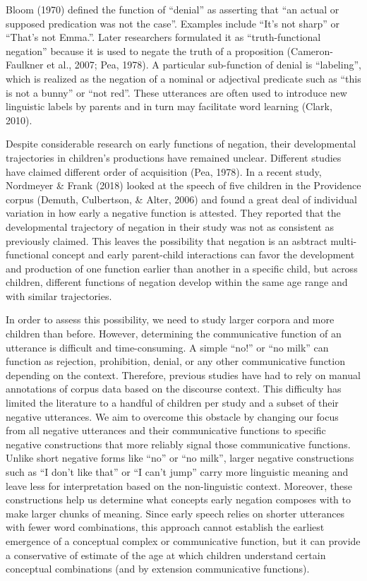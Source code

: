 \documentclass[10pt, letterpaper]{article}
\begin{document}
Bloom (1970) defined the function of ``denial'' as asserting that ``an
actual or supposed predication was not the case''. Examples include
``It's not sharp'' or ``That's not Emma.''. Later researchers formulated
it as ``truth-functional negation'' because it is used to negate the
truth of a proposition (Cameron-Faulkner et al., 2007; Pea, 1978). A
particular sub-function of denial is ``labeling'', which is realized as
the negation of a nominal or adjectival predicate such as ``this is not
a bunny'' or ``not red''. These utterances are often used to introduce
new linguistic labels by parents and in turn may facilitate word
learning (Clark, 2010).

Despite considerable research on early functions of negation, their
developmental trajectories in children's productions have remained
unclear. Different studies have claimed different order of acquisition
(Pea, 1978). In a recent study, Nordmeyer \& Frank (2018) looked at the
speech of five children in the Providence corpus (Demuth, Culbertson, \&
Alter, 2006) and found a great deal of individual variation in how early
a negative function is attested. They reported that the developmental
trajectory of negation in their study was not as consistent as
previously claimed. This leaves the possibility that negation is an
asbtract multi-functional concept and early parent-child interactions
can favor the development and production of one function earlier than
another in a specific child, but across children, different functions of
negation develop within the same age range and with similar
trajectories.

In order to assess this possibility, we need to study larger corpora and
more children than before. However, determining the communicative
function of an utterance is difficult and time-consuming. A simple
``no!'' or ``no milk'' can function as rejection, prohibition, denial,
or any other communicative function depending on the context. Therefore,
previous studies have had to rely on manual annotations of corpus data
based on the discourse context. This difficulty has limited the
literature to a handful of children per study and a subset of their
negative utterances. We aim to overcome this obstacle by changing our
focus from all negative utterances and their communicative functions to
specific negative constructions that more reliably signal those
communicative functions. Unlike short negative forms like ``no'' or ``no
milk'', larger negative constructions such as ``I don't like that'' or
``I can't jump'' carry more linguistic meaning and leave less for
interpretation based on the non-linguistic context. Moreover, these
constructions help us determine what concepts early negation composes
with to make larger chunks of meaning. Since early speech relies on
shorter utterances with fewer word combinations, this approach cannot
establish the earliest emergence of a conceptual complex or
communicative function, but it can provide a conservative of estimate of
the age at which children understand certain conceptual combinations
(and by extension communicative functions).
\end{document}
